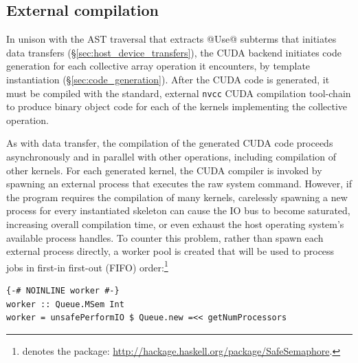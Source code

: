 \subsection{External compilation}
\label{sec:external_compilation}

In unison with the AST traversal that extracts @Use@ subterms that initiates
data transfers (\S\ref{sec:host_device_transfers}), the CUDA backend initiates
code generation for each collective array operation it encounters, by template
instantiation (\S\ref{sec:code_generation}). After the CUDA code is generated,
it must be compiled with the standard, external \texttt{nvcc} CUDA compilation
tool-chain to produce binary object code for each of the kernels implementing
the collective operation.

As with data transfer, the compilation of the generated CUDA code proceeds
asynchronously and in parallel with other operations, including compilation of
other kernels.
For each generated kernel, the CUDA compiler is invoked by spawning an external
process that executes the raw system command. However, if the program requires
the compilation of many kernels, carelessly spawning a new process for every
instantiated skeleton can cause the IO bus to become saturated, increasing
overall compilation time, or even exhaust the host operating system's available
process handles. To counter this problem, rather than spawn each external
process directly, a worker pool is created that will be used to process jobs in
first-in first-out (FIFO) order:\footnote{ denotes the
 package: \url{http://hackage.haskell.org/package/SafeSemaphore}.}

\begin{lstlisting}[style=haskell]
{-# NOINLINE worker #-}
worker :: Queue.MSem Int
worker = unsafePerformIO $ Queue.new =<< getNumProcessors
\end{lstlisting}

